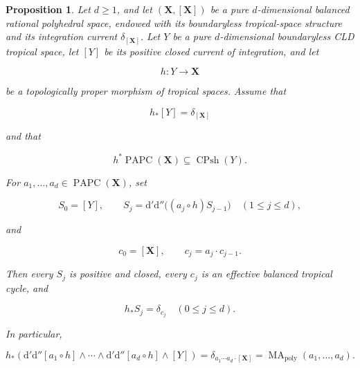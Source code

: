 \documentclass[11pt,a4paper]{article}
\newtheorem{proposition}[proposition]{Proposition}
\theoremstyle{definition}
\theoremstyle{remark}
\newcommand{\rd}{\mathrm d}
\newcommand{\dprime}{\rd'}
\newcommand{\ddprime}{\rd''}
\newcommand{\dprimeddprime}{\dprime\ddprime}
\DeclareMathOperator{\MA}{MA}
\begin{document}
\begin{proposition}\label{prop:p053-projection-recursion-repaired-candidate}
Let \(d\geq1\), and let \((\mathbf X,[\mathbf X])\) be a pure
\(d\)-dimensional balanced rational polyhedral space, endowed with its
boundaryless tropical-space structure and its integration current
\(\delta_{[\mathbf X]}\).  Let \(Y\) be a pure \(d\)-dimensional
boundaryless CLD tropical space, let \([Y]\) be its positive closed current
of integration, and let

\[
 h:Y\longrightarrow\mathbf X
\]

be a topologically proper morphism of tropical spaces.  Assume that

\begin{equation}
 h_*[Y]=\delta_{[\mathbf X]}
 \label{eq:p053-repaired-top-calibration}
\end{equation}

and that

\begin{equation}
 h^*\operatorname{PAPC}(\mathbf X)
 \subseteq \operatorname{CPsh}(Y).
 \label{eq:p053-repaired-psh-pullback}
\end{equation}

For \(a_1,\ldots,a_d\in\operatorname{PAPC}(\mathbf X)\), set

\begin{equation}
 S_0=[Y],\qquad
 S_j=\dprimeddprime\bigl((a_j\circ h)S_{j-1}\bigr)
 \quad (1\leq j\leq d),
 \label{eq:p053-repaired-source-recursion}
\end{equation}

and

\begin{equation}
 c_0=[\mathbf X],\qquad c_j=a_j\cdot c_{j-1}.
 \label{eq:p053-repaired-target-recursion}
\end{equation}

Then every \(S_j\) is positive and closed, every \(c_j\) is an effective
balanced tropical cycle, and

\begin{equation}
 h_*S_j=\delta_{c_j}
 \quad (0\leq j\leq d).
 \label{eq:p053-repaired-intermediate-pushforward}
\end{equation}

In particular,

\begin{equation}
 h_*\!\left(
   \dprimeddprime[a_1\circ h]\wedge\cdots\wedge
   \dprimeddprime[a_d\circ h]\wedge[Y]
 \right)
 =\delta_{a_1\cdots a_d\cdot[\mathbf X]}
 =\MA_{\mathrm{poly}}(a_1,\ldots,a_d).
 \label{eq:p053-repaired-pa-comparison}
\end{equation}


\end{proposition}
\end{document}
